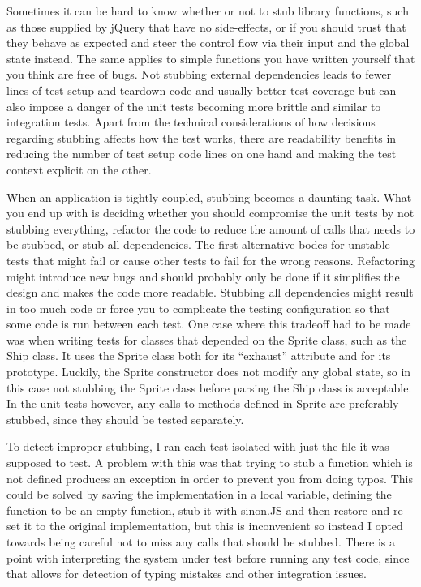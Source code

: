 \documentclass[11pt]{article}
\begin{document}
Sometimes it can be hard to know whether or not to stub library functions, such as those supplied by jQuery that have no side-effects, or if you should trust that they behave as expected and steer the control flow via their input and the global state instead. The same applies to simple functions you have written yourself that you think are free of bugs. Not stubbing external dependencies leads to fewer lines of test setup and teardown code and usually better test coverage but can also impose a danger of the unit tests becoming more brittle and similar to integration tests. Apart from the technical considerations of how decisions regarding stubbing affects how the test works, there are readability benefits in reducing the number of test setup code lines on one hand and making the test context explicit on the other.

When an application is tightly coupled, stubbing becomes a daunting task. What you end up with is deciding whether you should compromise the unit tests by not stubbing everything, refactor the code to reduce the amount of calls that needs to be stubbed, or stub all dependencies. The first alternative bodes for unstable tests that might fail or cause other tests to fail for the wrong reasons. Refactoring might introduce new bugs and should probably only be done if it simplifies the design and makes the code more readable. Stubbing all dependencies might result in too much code or force you to complicate the testing configuration so that some code is run between each test. One case where this tradeoff had to be made was when writing tests for classes that depended on the Sprite class, such as the Ship class. It uses the Sprite class both for its ``exhaust'' attribute and for its prototype. Luckily, the Sprite constructor does not modify any global state, so in this case not stubbing the Sprite class before parsing the Ship class is acceptable. In the unit tests however, any calls to methods defined in Sprite are preferably stubbed, since they should be tested separately.

To detect improper stubbing, I ran each test isolated with just the file it was supposed to test. A problem with this was that trying to stub a function which is not defined produces an exception in order to prevent you from doing typos. This could be solved by saving the implementation in a local variable, defining the function to be an empty function, stub it with sinon.JS and then restore and re-set it to the original implementation, but this is inconvenient so instead I opted towards being careful not to miss any calls that should be stubbed. There is a point with interpreting the system under test before running any test code, since that allows for detection of typing mistakes and other integration issues.
\end{document}
